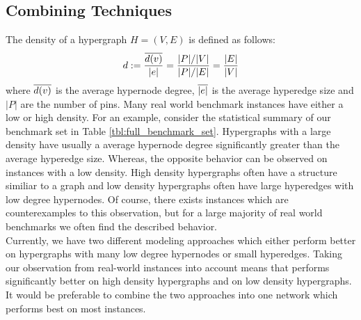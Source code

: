 \subsection{Combining Techniques}
\label{sec:hybrid_network}

The density of a hypergraph $H = (V,E)$ is defined as follows:
\[d := \frac{\overline{d(v)}}{|e|} = \frac{|P|/|V|}{|P|/|E|} = \frac{|E|}{|V|}\]
where $\overline{d(v)}$ is the average hypernode degree, $\overline{|e|}$ is the average hyperedge
size and $|P|$ are the number of pins. Many real world benchmark instances have either a low 
or high density. For an example, consider the statistical summary of our benchmark set in
Table \ref{tbl:full_benchmark_set}. Hypergraphs with a large density have usually a average
hypernode degree significantly greater than the average hyperedge size. Whereas, the opposite
behavior can be observed on instances with a low density. High density hypergraphs often have a structure
similiar to a graph and low density hypergraphs often have large hyperedges with low degree
hypernodes. Of course, there exists instances which are counterexamples to this observation, 
but for a large majority of real world benchmarks we often find the described behavior.\\
Currently, we have two different modeling approaches which either perform better on hypergraphs with
many low degree hypernodes or small hyperedges. Taking our observation from real-world instances 
into account means that  performs significantly better on high density hypergraphs
and  on low density hypergraphs. It would be preferable to combine 
the two approaches into one network which performs best on most instances. \\

